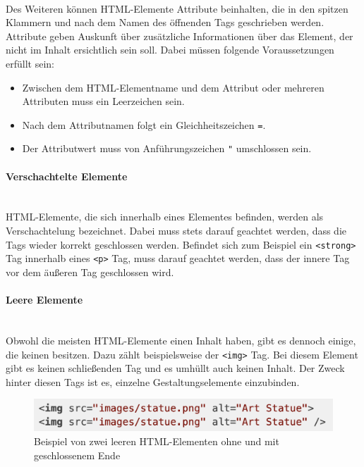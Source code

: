 \mbox{}\\
Des Weiteren können HTML-Elemente Attribute beinhalten, die in den spitzen Klammern und nach dem Namen des öffnenden Tags geschrieben werden. Attribute geben Auskunft über zusätzliche Informationen über das Element, der nicht im Inhalt ersichtlich sein soll. Dabei müssen folgende Voraussetzungen erfüllt sein:

\begin{itemize}
	\item Zwischen dem HTML-Elementname und dem Attribut oder mehreren Attributen muss ein Leerzeichen sein.
	\item Nach dem Attributnamen folgt ein Gleichheitszeichen \texttt{=}.
	\item Der Attributwert muss von Anführungszeichen \texttt{"} umschlossen sein.
\end{itemize}

\paragraph{Verschachtelte Elemente}
\mbox{}\\
HTML-Elemente, die sich innerhalb eines Elementes befinden, werden als Verschachtelung bezeichnet. Dabei muss stets darauf geachtet werden, dass die Tags wieder korrekt geschlossen werden. Befindet sich zum Beispiel ein \texttt{<strong>} Tag innerhalb eines \texttt{<p>} Tag, muss darauf geachtet werden, dass der innere Tag vor dem äußeren Tag geschlossen wird. 

\paragraph{Leere Elemente}
\mbox{}\\
Obwohl die meisten HTML-Elemente einen Inhalt haben, gibt es dennoch einige, die keinen besitzen. Dazu zählt beispielsweise der \texttt{<img>} Tag. Bei diesem Element gibt es keinen schließenden Tag und es umhüllt auch keinen Inhalt. Der Zweck hinter
diesen Tags ist es, einzelne Gestaltungselemente einzubinden.

\begin{figure}[H]
	\begin{center}
		\includegraphics[scale=.5]{images/empty-element-example.png}
	\end{center}
		\caption{Beispiel von zwei leeren HTML-Elementen ohne und mit geschlossenem Ende}
\end{figure}

